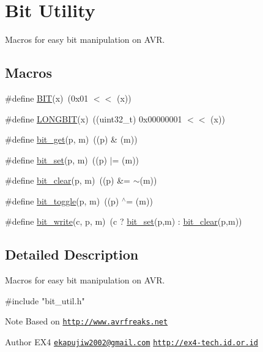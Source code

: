 \hypertarget{group__ex4__bit__util}{\section{Bit Utility}
\label{group__ex4__bit__util}
}


Macros for easy bit manipulation on A\-V\-R.  


\subsection*{Macros}
\begin{DoxyCompactItemize}
\item 
\#define \hyperlink{group__ex4__bit__util_gad27cc17b25bb93134368d5eb21126eae}{B\-I\-T}(x)~(0x01 $<$$<$ (x))
\item 
\#define \hyperlink{group__ex4__bit__util_gafbad7382b813042047886a12523a1d5f}{L\-O\-N\-G\-B\-I\-T}(x)~((uint32\-\_\-t) 0x00000001 $<$$<$ (x))
\item 
\#define \hyperlink{group__ex4__bit__util_gaec77c58e5539c8e65add55cb11b4d21a}{bit\-\_\-get}(p, m)~((p) \& (m))
\item 
\#define \hyperlink{group__ex4__bit__util_ga05adecac4f6f6e2d5e6bf43b496bbc9f}{bit\-\_\-set}(p, m)~((p) $|$= (m))
\item 
\#define \hyperlink{group__ex4__bit__util_ga4befea8f39b82371375372c32827a577}{bit\-\_\-clear}(p, m)~((p) \&= $\sim$(m))
\item 
\#define \hyperlink{group__ex4__bit__util_ga31de5ed72e62c2b845d7a31f04620a2b}{bit\-\_\-toggle}(p, m)~((p) $^\wedge$= (m))
\item 
\#define \hyperlink{group__ex4__bit__util_ga05ade03b93a62632d066d5f2ce5aed26}{bit\-\_\-write}(c, p, m)~(c ? \hyperlink{group__ex4__bit__util_ga05adecac4f6f6e2d5e6bf43b496bbc9f}{bit\-\_\-set}(p,m) \-: \hyperlink{group__ex4__bit__util_ga4befea8f39b82371375372c32827a577}{bit\-\_\-clear}(p,m))
\end{DoxyCompactItemize}


\subsection{Detailed Description}
Macros for easy bit manipulation on A\-V\-R. 
\begin{DoxyCode}
\textcolor{preprocessor}{ #include "bit\_util.h"} 
\end{DoxyCode}


\begin{DoxyNote}{Note}
Based on \href{http://www.avrfreaks.net}{\tt http\-://www.\-avrfreaks.\-net} 
\end{DoxyNote}
\begin{DoxyAuthor}{Author}
E\-X4 \href{mailto:ekapujiw2002@gmail.com}{\tt ekapujiw2002@gmail.\-com} \href{http://ex4-tech.id.or.id}{\tt http\-://ex4-\/tech.\-id.\-or.\-id} 
\end{DoxyAuthor}


